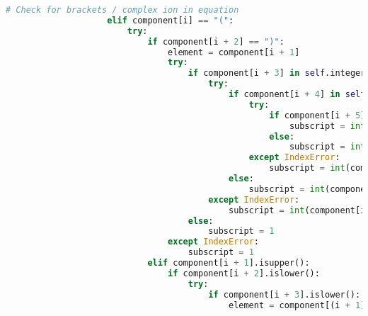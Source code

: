 \documentclass[a4paper,12pt]{article}
\begin{document}
\begin{lstlisting}[language=Python, caption=parseComponent method for finding elements]
                    # Check for brackets / complex ion in equation
                    elif component[i] == "(":
                        try:
                            if component[i + 2] == ")":
                                element = component[i + 1]
                                try:
                                    if component[i + 3] in self.integers:
                                        try:
                                            if component[i + 4] in self.integers:
                                                try:
                                                    if component[i + 5] in self.integers:
                                                        subscript = int(component[(i + 3): (i + 6)])
                                                    else:
                                                        subscript = int(component[(i + 3): (i + 5)])
                                                except IndexError:
                                                    subscript = int(component[(i + 3): (i + 5)])
                                            else:
                                                subscript = int(component[(i + 3): (i + 4)])
                                        except IndexError:
                                            subscript = int(component[i + 3])
                                    else:
                                        subscript = 1
                                except IndexError:
                                    subscript = 1
                            elif component[i + 1].isupper():
                                if component[i + 2].islower():
                                    try:
                                        if component[i + 3].islower():
                                            element = component[(i + 1): (i + 4)]


\end{lstlisting}
\end{document}

